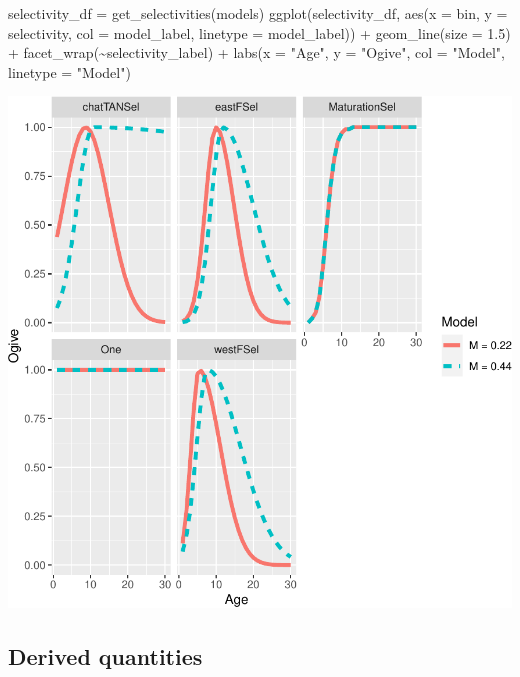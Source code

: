\documentclass[
]{book}
\newenvironment{Shaded}{\begin{snugshade}}{\end{snugshade}}
\newcommand{\AttributeTok}[1]{\textcolor[rgb]{0.77,0.63,0.00}{#1}}
\newcommand{\FloatTok}[1]{\textcolor[rgb]{0.00,0.00,0.81}{#1}}
\newcommand{\FunctionTok}[1]{\textcolor[rgb]{0.00,0.00,0.00}{#1}}
\newcommand{\NormalTok}[1]{#1}
\newcommand{\OtherTok}[1]{\textcolor[rgb]{0.56,0.35,0.01}{#1}}
\newcommand{\SpecialCharTok}[1]{\textcolor[rgb]{0.00,0.00,0.00}{#1}}
\newcommand{\StringTok}[1]{\textcolor[rgb]{0.31,0.60,0.02}{#1}}
\begin{document}
\begin{Shaded}
\begin{Highlighting}[]
\NormalTok{selectivity\_df }\OtherTok{=} \FunctionTok{get\_selectivities}\NormalTok{(models)}
\FunctionTok{ggplot}\NormalTok{(selectivity\_df, }\FunctionTok{aes}\NormalTok{(}\AttributeTok{x =}\NormalTok{ bin, }\AttributeTok{y =}\NormalTok{ selectivity, }\AttributeTok{col =}\NormalTok{ model\_label, }\AttributeTok{linetype =}\NormalTok{ model\_label)) }\SpecialCharTok{+}
  \FunctionTok{geom\_line}\NormalTok{(}\AttributeTok{size =} \FloatTok{1.5}\NormalTok{) }\SpecialCharTok{+}
  \FunctionTok{facet\_wrap}\NormalTok{(}\SpecialCharTok{\textasciitilde{}}\NormalTok{selectivity\_label) }\SpecialCharTok{+}
  \FunctionTok{labs}\NormalTok{(}\AttributeTok{x =} \StringTok{"Age"}\NormalTok{, }\AttributeTok{y =} \StringTok{"Ogive"}\NormalTok{, }\AttributeTok{col =} \StringTok{"Model"}\NormalTok{, }\AttributeTok{linetype =} \StringTok{"Model"}\NormalTok{)}
\end{Highlighting}
\end{Shaded}

\includegraphics{_main_files/figure-latex/compare_selectivities-1.pdf}

\hypertarget{derived-quantities}{%
\subsection{Derived quantities}\label{derived-quantities}}
\end{document}

